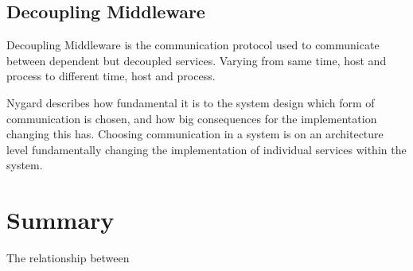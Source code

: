 \subsection{Decoupling Middleware}
Decoupling Middleware is the communication protocol used to communicate between dependent but decoupled services. Varying from same time, host and process to different time, host and process.

Nygard describes how fundamental it is to the system design which form of communication is chosen, and how big consequences for the implementation changing this has. Choosing communication in a system is on an architecture level fundamentally changing the implementation of individual services within the system.

\section{Summary}
The relationship between 